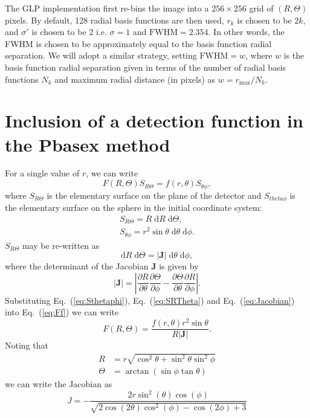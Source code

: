 \documentclass{article}
\renewcommand{\eqref}[1]{Eq.~(\ref{#1})}
\newcommand{\pd}[2]{\ensuremath{\frac{\partial#1}{\partial#2}}}
\newcommand{\dee}{\ensuremath{\mathrm{d}}}
\begin{document}
The GLP implementation first re-bins the image into a $256\times256$ grid of
$(R, \Theta)$ pixels. By default, 128 radial basis functions are then used,
$r_k$ is chosen to be $2k$, and $\sigma'$ is chosen to be 2 i.e. $\sigma=1$
and $\mathrm{FWHM}=2.354$. In other words, the FWHM is chosen to be
approximately equal to the basis function radial separation. We will adopt a
similar strategy, setting $\mathrm{FWHM}=w$, where $w$ is the basis function
radial separation given in terms of the number of radial basis functions $N_k$
and maximum radial distance (in pixels) as $w=r_\mathrm{max}/N_k$.

\section{Inclusion of a detection function in the Pbasex method}
For a single value of $r$, we can write
\begin{equation}
  \label{eq:Ff}
  F(R, \Theta)S_{R\Theta}=f(r, \theta)S_{\theta\phi},
\end{equation}
where $S_{R\Theta}$ is the elementary surface on the plane of the detector and
$S_{theta\phi}$ is the elementary surface on the sphere in the initial
coordinate system:
\begin{gather}
  S_{R\Theta} = R\;\dee R\;\dee\Theta,\\
  \label{eq:Sthetaphi}
  S_{\theta\phi} = r^2\sin\theta\;\dee\theta\;\dee\phi.
\end{gather}
$S_{R\Theta}$ may be re-written as 
\begin{equation}
  \label{eq:SRTheta}
  \dee R\;\dee\Theta=|\mathbf{J}|\;\dee\theta\;\dee\phi,
\end{equation}
where the determinant of the Jacobian $\mathbf{J}$ is given by
\begin{equation}
  \label{eq:Jacobian}
  |\mathbf{J}| = 
  \left|
    \pd{R}{\theta}\pd{\Theta}{\phi}
    -
    \pd{\Theta}{\theta}\pd{R}{\phi}
    \right|.
\end{equation}
Substituting \eqref{eq:Sthetaphi}, \eqref{eq:SRTheta} and \eqref{eq:Jacobian}
into \eqref{eq:Ff} we can write
\begin{equation}
  F(R, \Theta)=
  \frac{f(r,\theta)r^2\sin\theta}{R|\mathbf{J}|}.
\end{equation}
Noting that
\begin{subequations}
  \begin{align}
    R&=r\sqrt{\cos^2\theta+\sin^2\theta\sin^2\phi}\\
    \Theta&=\arctan(\sin\phi\tan\theta)
  \end{align}
\end{subequations}
we can write the Jacobian as
\begin{equation}
  J = -\frac{2 r \sin ^2(\theta ) \cos (\phi )}
  {\sqrt{2 \cos (2 \theta ) \cos ^2(\phi )-\cos (2 \phi )+3}}
\end{equation}
\end{document}
